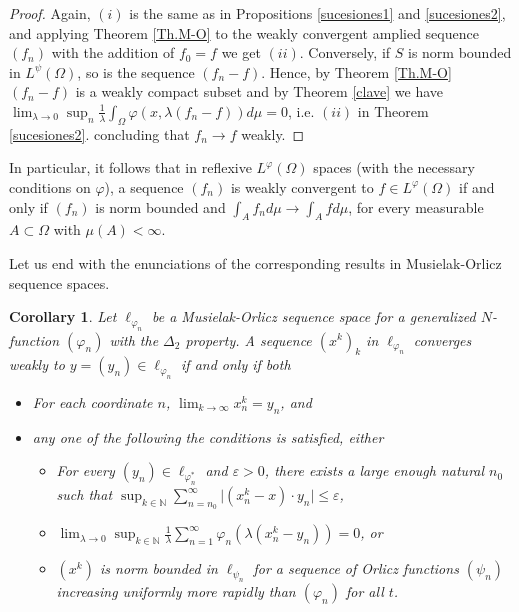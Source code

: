 \documentclass[11pt,a4paper]{amsart}
\newtheorem{corolario}[definicion]{Corollary}
\newcommand{\nat}{\mathbb{N}}
\newcommand{\lphi}{{L^{\varphi}(\Omega)}}
\newcommand{\lpsi}{{L^{\psi}(\Omega)}}
\begin{document}
\begin{proof}
    Again, $(i)$ is the same as in Propositions \ref{sucesiones1} and \ref{sucesiones2}, and applying Theorem \ref{Th.M-O} to the weakly convergent amplied sequence $(f_n)$ with the addition of $f_0=f$ we get $(ii)$. Conversely, if $S$ is norm bounded in $\lpsi$, so is the sequence $(f_n-f)$. Hence, by Theorem \ref{Th.M-O} $(f_n-f)$ is a weakly compact subset and by Theorem \ref{clave} we have $\lim_{\lambda\rightarrow 0}\sup_{n} \frac{1}{\lambda}\int_{\Omega} \varphi(x, \lambda ( f_{n}-f) ) d\mu = 0$, i.e. $(ii)$ in Theorem \ref{sucesiones2}. concluding that $f_n\rightarrow f$ weakly.
\end{proof}


In particular, it follows that in reflexive $\lphi$ spaces (with the necessary conditions on $\varphi$), a sequence $(f_{n})$ is weakly convergent to  $f\in \lphi $ if and only if $(f_{n})$ is norm bounded and $\int_{A} f_{n} d\mu \rightarrow \int_{A} f d\mu$, for every measurable $A \subset \Omega$ with $\mu(A)<\infty$.

Let us end with the enunciations of the corresponding results in Musielak-Orlicz sequence spaces.

\begin{corolario}\label{corolario-Nakano2}
Let $\ell_{\varphi_n}$ be a Musielak-Orlicz sequence space for a generalized $N$-function $(\varphi_n)$ with the $\Delta_2$ property. A sequence $(x^k)_k$  in $\ell_{\varphi_n}$ converges weakly to $y=(y_n)\in \ell_{\varphi_n}$ if and only if both
\begin{itemize}
    \item [$(i)$] For each coordinate $n$, $\lim_{k\rightarrow \infty} x_n^k=y_n$, and
    \item [$(ii)$] any one of the following the conditions is satisfied, either   
    \begin{itemize}
        \item [$(a)$] For every $(y_n)\in\ell_{\varphi_n^*}$ and $\varepsilon>0$, there exists a large enough natural $n_0$ such that $\sup_{k\in\mathbb{N}}\sum_{n=n_0}^{\infty} \vert(x^k_n-x)\cdot y_n\vert\leq \varepsilon$,
        \item [$(b)$] $\lim_{\lambda\rightarrow 0}\sup_{k\in\nat} \frac{1}{\lambda}\sum_{n=1}^{\infty} \varphi_n (\lambda (x_n^k-y_n))=0$, or
        \item [$(c)$] $(x^k)$ is norm bounded in $\ell_{\psi_n}$ for a sequence of Orlicz functions $(\psi_n)$ increasing uniformly more rapidly than $(\varphi_n)$ for all $t$.
    \end{itemize}
\end{itemize}
\end{corolario}
\end{document}
